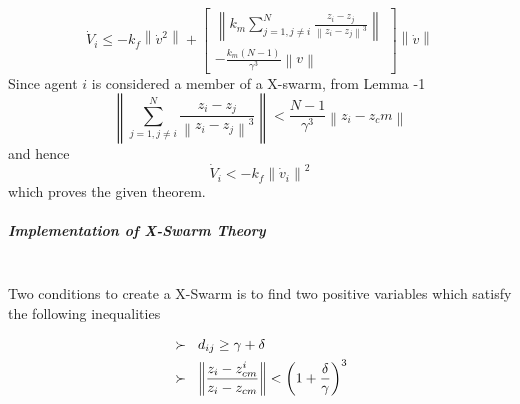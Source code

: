 \documentclass[twoside]{article}
\newcommand{\norm}[1]{\left\lVert#1\right\rVert}
\begin{document}
			\begin{equation}
\dot{V}_i \leq -k_f \norm{\dot{v}^2} + \begin{bmatrix}
\norm{k_m \sum_{j=1, j \neq i}^{N} \frac{z_i - z_j}{\norm{z_i - z_j}^3}} \\
- \frac{k_m(N-1)}{\gamma ^3} \norm{v}
\end{bmatrix} \norm{\dot{v}}
			\end{equation}
			Since agent $i$ is considered a member of a X-swarm, from Lemma -1
			\begin{equation}
\norm{ \sum_{j=1, j \neq i}^{N} \frac{z_i - z_j}{\norm{z_i - z_j}^3}} < \frac{N-1}{\gamma^3} \norm{z_i - z_cm}
			\end{equation}
			and hence
			\begin{equation}
\dot{V}_i < -k_f \norm{\dot{v}_i} ^2
			\end{equation}
			which proves the given theorem.  \newline

	\subparagraph{Implementation of X-Swarm Theory}\hspace{0pt} \\		

Two conditions to create a X-Swarm is to find two positive variables which satisfy the following inequalities

		\begin{align*}
		&\succ\hspace{0.2cm}  d_{ij} \geq \gamma + \delta \\
		&\succ \hspace{0.2cm}   \norm{\frac{z_i - z_{cm}^i}{z_i - z_{cm}}} < \left(1+\frac{\delta}{\gamma}\right)^3
		\end{align*}
		
\end{document}
